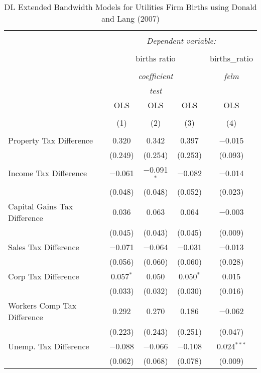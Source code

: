 
\begin{table}[!htbp] \centering 
  \caption{DL Extended Bandwidth Models for  Utilities Firm Births using Donald and Lang (2007)} 
  \label{} 
\begin{tabular}{@{\extracolsep{5pt}}lcccc} 
\\[-1.8ex]\hline 
\hline \\[-1.8ex] 
 & \multicolumn{4}{c}{\textit{Dependent variable:}} \\ 
\cline{2-5} 
\\[-1.8ex] & \multicolumn{3}{c}{births ratio} & births\_ratio \\ 
\\[-1.8ex] & \multicolumn{3}{c}{\textit{coefficient}} & \textit{felm} \\ 
 & \multicolumn{3}{c}{\textit{test}} & \textit{} \\ 
 & OLS & OLS & OLS & OLS \\ 
\\[-1.8ex] & (1) & (2) & (3) & (4)\\ 
\hline \\[-1.8ex] 
 Property Tax Difference & 0.320 & 0.342 & 0.397 & $-$0.015 \\ 
  & (0.249) & (0.254) & (0.253) & (0.093) \\ 
  Income Tax Difference & $-$0.061 & $-$0.091$^{*}$ & $-$0.082 & $-$0.014 \\ 
  & (0.048) & (0.048) & (0.052) & (0.023) \\ 
  Capital Gains Tax Difference & 0.036 & 0.063 & 0.064 & $-$0.003 \\ 
  & (0.045) & (0.043) & (0.045) & (0.009) \\ 
  Sales Tax Difference & $-$0.071 & $-$0.064 & $-$0.031 & $-$0.013 \\ 
  & (0.056) & (0.060) & (0.060) & (0.028) \\ 
  Corp Tax Difference & 0.057$^{*}$ & 0.050 & 0.050$^{*}$ & 0.015 \\ 
  & (0.033) & (0.032) & (0.030) & (0.016) \\ 
  Workers Comp Tax Difference & 0.292 & 0.270 & 0.186 & $-$0.062 \\ 
  & (0.223) & (0.243) & (0.251) & (0.047) \\ 
  Unemp. Tax Difference & $-$0.088 & $-$0.066 & $-$0.108 & 0.024$^{***}$ \\ 
  & (0.062) & (0.068) & (0.078) & (0.009) \\ 

\end{tabular}
\end{table}
